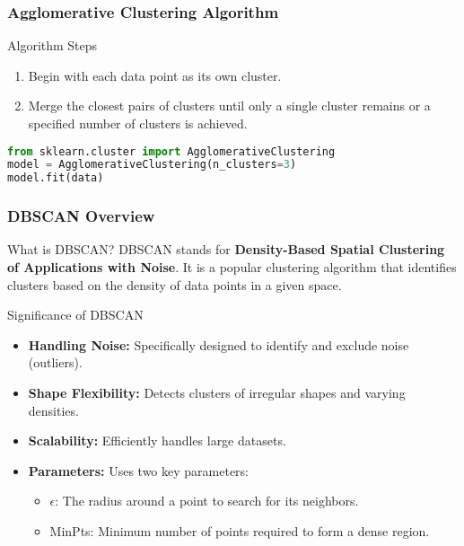 \documentclass[aspectratio=169]{beamer}
\begin{document}
\begin{frame}[fragile]
    \frametitle{Agglomerative Clustering Algorithm}
    \begin{block}{Algorithm Steps}
        \begin{enumerate}
            \item Begin with each data point as its own cluster.
            \item Merge the closest pairs of clusters until only a single cluster remains or a specified number of clusters is achieved.
        \end{enumerate}
    \end{block}
    
    \begin{lstlisting}[language=python]
from sklearn.cluster import AgglomerativeClustering
model = AgglomerativeClustering(n_clusters=3)
model.fit(data)
    \end{lstlisting}
\end{frame}

\begin{frame}[fragile]
    \frametitle{DBSCAN Overview}
    \begin{block}{What is DBSCAN?}
        DBSCAN stands for \textbf{Density-Based Spatial Clustering of Applications with Noise}. It is a popular clustering algorithm that identifies clusters based on the density of data points in a given space.
    \end{block}
    \begin{block}{Significance of DBSCAN}
        \begin{itemize}
            \item \textbf{Handling Noise:} Specifically designed to identify and exclude noise (outliers).
            \item \textbf{Shape Flexibility:} Detects clusters of irregular shapes and varying densities.
            \item \textbf{Scalability:} Efficiently handles large datasets.
            \item \textbf{Parameters:} Uses two key parameters: 
            \begin{itemize}
                \item $\epsilon$: The radius around a point to search for its neighbors.
                \item MinPts: Minimum number of points required to form a dense region.
            \end{itemize}
        \end{itemize}
    \end{block}
\end{frame}
\end{document}
